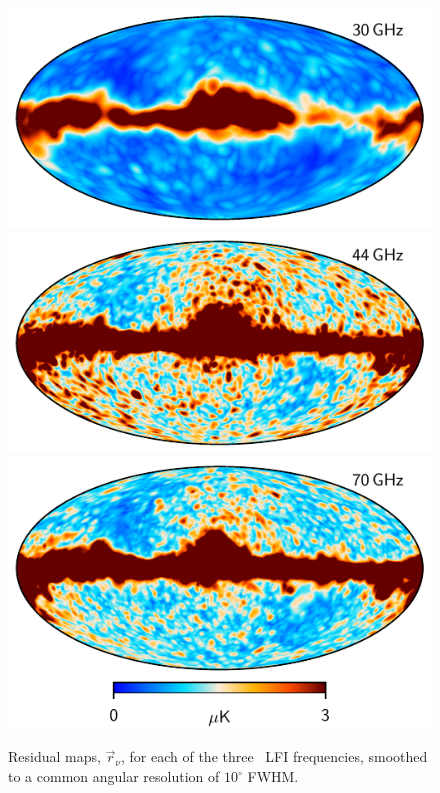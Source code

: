 \documentclass[twocolumn]{aa}
\renewcommand{\r}[0]{\vec{r}}
\begin{document}
\begin{figure}
	\begin{center}
		\includegraphics[width=\linewidth]{figs/todres_030_maxabs.pdf}\\
		\includegraphics[width=\linewidth]{figs/todres_044_maxabs.pdf}\\
		\includegraphics[width=\linewidth]{figs/todres_070_maxabs.pdf}\\
	\end{center}
	\caption{Residual maps, $\r_{\nu}$, for each of the three
		\Planck\ LFI frequencies, smoothed to a common angular resolution
		of $10^{\circ}$ FWHM. 
		\label{fig:todres}}
\end{figure}
\end{document}

